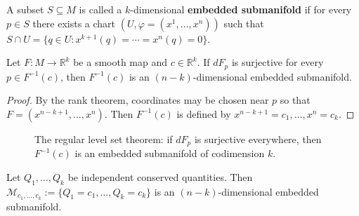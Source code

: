 \begin{definition}\label{def:embedded_submanifold}
A subset $S \subseteq M$ is called a $k$-dimensional \textbf{embedded submanifold} if for every $p \in S$ there exists a chart $(U, \varphi = (x^1, \dots, x^n))$ such that $S \cap U = \{q \in U : x^{k+1}(q) = \cdots = x^n(q) = 0\}$.
\end{definition}

\begin{theorem}\label{thm:regular_level_set}
Let $F: M \to \mathbb{R}^k$ be a smooth map and $c \in \mathbb{R}^k$. If $dF_p$ is surjective for every $p \in F^{-1}(c)$, then $F^{-1}(c)$ is an $(n-k)$-dimensional embedded submanifold.
\end{theorem}

\begin{proof}
By the rank theorem, coordinates may be chosen near $p$ so that $F = (x^{n-k+1}, \dots, x^n)$. Then $F^{-1}(c)$ is defined by $x^{n-k+1} = c_1, \dots, x^n = c_k$.
\end{proof}

\begin{figure}[htbp]
\centering
{}
\caption{The regular level set theorem: if $dF_p$ is surjective everywhere, then $F^{-1}(c)$ is an embedded submanifold of codimension $k$.}
\label{fig:regular_level_set}
\end{figure}

\begin{corollary}\label{cor:conservation_levelset}
Let $Q_1, \dots, Q_k$ be independent conserved quantities. Then $\mathcal{M}_{c_1, \dots, c_k} := \{Q_1 = c_1, \dots, Q_k = c_k\}$ is an $(n-k)$-dimensional embedded submanifold.
\end{corollary}

